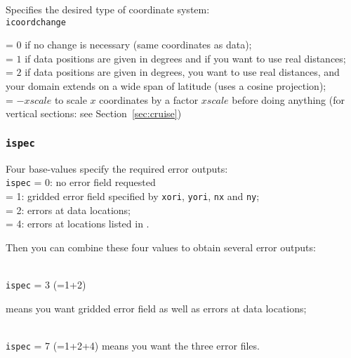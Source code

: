 Specifies the desired type of coordinate system:\\

\texttt{icoordchange} \begin{minipage}[t]{.7\textwidth} = $0$ if no change is necessary (same coordinates as data);\\
                                                        = $1$ if data positions are given in degrees and if you want to use real distances;\\
                                                        = $2$ if data positions are given in degrees, you want to use real distances, and your domain extends on a wide span of latitude                                                           (uses a cosine projection);\\
                                                        = $-xscale$ to scale $x$ coordinates by a factor $xscale$ before doing anything (for vertical sections: see Section~\ref{sec:cruise})
                      \end{minipage}
                      
                      
\subsubsection{\texttt{ispec}}

Four base-values specify the required error outputs:\\

\texttt{ispec}       = 0\qquad: no error field requested\\
  = 1\qquad: gridded error field specified by \texttt{xori}, \texttt{yori}, \texttt{nx} and \texttt{ny}; \\
  = 2\qquad: errors at data locations;\\
  = 4\qquad: errors at locations listed in .

Then you can combine these four values to obtain several error outputs: 

\examples\\
\texttt{ispec}             = 3 (=1+2)\hphantom{+4} \qquad \begin{minipage}[t]{.7\textwidth}means you want gridded error field as well as errors at data locations;\end{minipage}\\ 
\texttt{ispec}             = 7 (=1+2+4) \qquad means you want the three error files.


